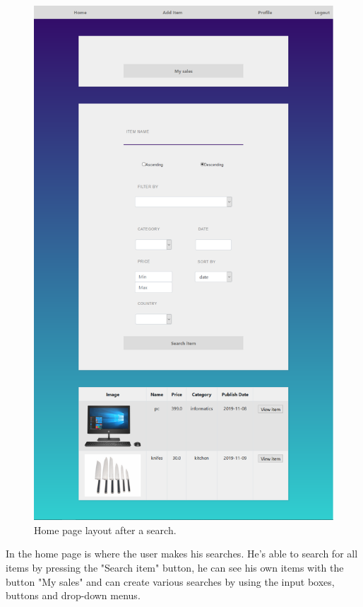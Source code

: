 \documentclass{article}
\begin{document}
\begin{figure}[H]
    \centering
    \includegraphics[scale=0.20]{homePage.png}
    \caption{Home page layout after a search.}
   \end{figure}

\qquad In the home page is where the user makes his searches. He's able to search for all items by pressing the "Search item" button, he can see his own items with the button "My sales" and can create various searches by using the input boxes, buttons and drop-down menus.
\end{document}
